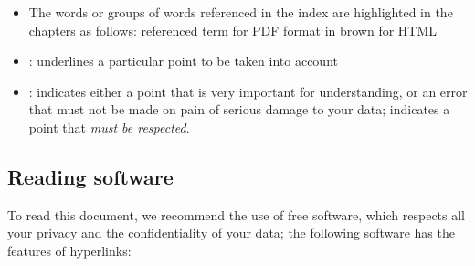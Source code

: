 \begin{itemize}
	\item The words or groups of words referenced in the index are highlighted in the chapters as follows:
		\newline
		\hspace*{1.5cm} \textopenbullet{} \textsf{referenced term} for \gls{PDF} format
		\newline
		\hspace*{1.5cm} \textopenbullet{} in brown for \gls{HTML}
	\item \Note{}: underlines a particular point to be taken into account
	\item \Attention{}: indicates either a point that is very important for understanding, or an error that must not be made on pain of serious damage to your data;\newline
	\Attention{} indicates a point that \emph{must be respected}.

\end{itemize}





\subsection{Reading software \label{introduction-manual-readers}}

To read this document, we recommend the use of free software, which respects all your privacy and the confidentiality of your data; the following software has the features of \gls{hyperlinks}:

